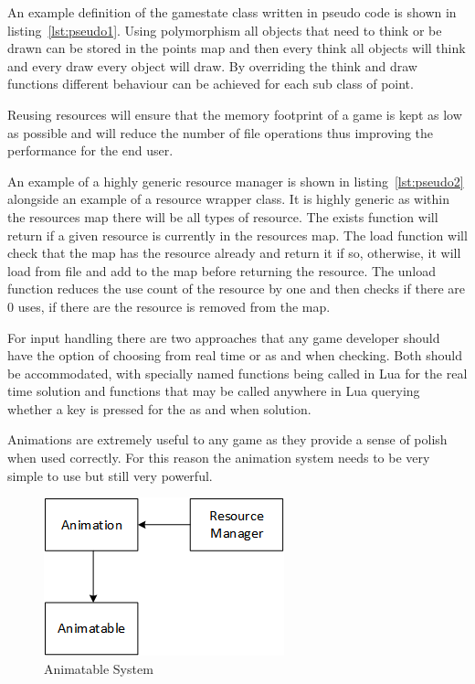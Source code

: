 \documentclass[11pt,a4paper,titlepage]{report}
\begin{document}
	An example definition of the gamestate class written in pseudo code is shown in listing~\ref{lst:pseudo1}. Using polymorphism all objects that need to think or be drawn can be stored in the points map and then every think all objects will think and every draw every object will draw. By overriding the think and draw functions different behaviour can be achieved for each sub class of point.

	Reusing resources will ensure that the memory footprint of a game is kept as low as possible and will reduce the number of file operations thus improving the performance for the end user.

	

	An example of a highly generic resource manager is shown in listing~\ref{lst:pseudo2} alongside an example of a resource wrapper class. It is highly generic as within the resources map there will be all types of resource. The exists function will return if a given resource is currently in the resources map. The load function will check that the map has the resource already and return it if so, otherwise, it will load from file and add to the map before returning the resource. The unload function reduces the use count of the resource by one and then checks if there are 0 uses, if there are the resource is removed from the map.


	For input handling there are two approaches that any game developer should have the option of choosing from real time or as and when checking. Both should be accommodated, with specially named functions being called in Lua for the real time solution and functions that may be called anywhere in Lua querying whether a key is pressed for the as and when solution.


	Animations are extremely useful to any game as they provide a sense of polish when used correctly. For this reason the animation system needs to be very simple to use but still very powerful.

	\begin{figure}[h] 
		\centering
		\includegraphics[scale=0.75]{animation1}
		\caption{Animatable System}
		\label{fig:Animation1}
	\end{figure}
\end{document}
